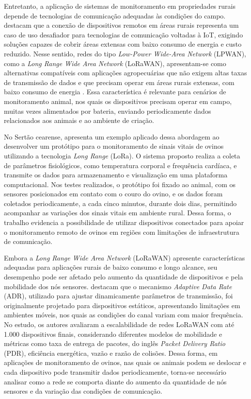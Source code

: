 Entretanto, a aplicação de sistemas de monitoramento em propriedades rurais depende de tecnologias de comunicação adequadas às condições do campo.  destacam que a conexão de dispositivos remotos em áreas rurais representa um caso de uso desafiador para tecnologias de comunicação voltadas à IoT, exigindo soluções capazes de cobrir áreas extensas com baixo consumo de energia e custo reduzido. Nesse sentido, redes do tipo \textit{Low-Power Wide-Area Network} (LPWAN), como a \textit{Long Range Wide Area Network} (LoRaWAN), apresentam-se como alternativas compatíveis com aplicações agropecuárias que não exigem altas taxas de transmissão de dados e que precisam operar em áreas rurais extensas, com baixo consumo de energia \cite{pagano2023}. Essa característica é relevante para cenários de monitoramento animal, nos quais os dispositivos precisam operar em campo, muitas vezes alimentados por bateria, enviando periodicamente dados relacionados aos animais e ao ambiente de criação.

No Sertão cearense,  apresenta um exemplo aplicado dessa abordagem ao desenvolver um protótipo para o monitoramento de sinais vitais de ovinos utilizando a tecnologia \textit{Long Range} (LoRa). O sistema proposto realiza a coleta de parâmetros fisiológicos, como temperatura corporal e frequência cardíaca, e transmite os dados para armazenamento e visualização em uma plataforma computacional. Nos testes realizados, o protótipo foi fixado ao animal, com os sensores posicionados em contato com o couro do ovino, e os dados foram coletados periodicamente, a cada cinco minutos, durante dois dias, permitindo acompanhar as variações dos sinais vitais em ambiente rural. Dessa forma, o trabalho evidencia a possibilidade de utilizar dispositivos conectados para apoiar o monitoramento remoto de ovinos em regiões com limitações de infraestrutura de comunicação.


Embora a \textit{Long Range Wide Area Network} (LoRaWAN) apresente características adequadas para aplicações rurais de baixo consumo e longo alcance, seu desempenho pode ser afetado pelo aumento da quantidade de dispositivos e pela mobilidade dos nós sensores.  destacam que o mecanismo \textit{Adaptive Data Rate} (ADR), utilizado para ajustar dinamicamente parâmetros de transmissão, foi originalmente projetado para dispositivos estáticos, apresentando limitações em ambientes móveis, nos quais as condições do canal variam com maior frequência. No estudo, os autores avaliaram a escalabilidade de redes LoRaWAN com até 1.000 dispositivos finais, considerando diferentes modelos de mobilidade e métricas como taxa de entrega de pacotes, do inglês \textit{Packet Delivery Ratio} (PDR), eficiência energética, vazão e razão de colisões. Dessa forma, em aplicações de monitoramento de ovinos, nas quais os animais podem se deslocar e cada dispositivo pode transmitir dados periodicamente, torna-se necessário analisar como a rede se comporta diante do aumento da quantidade de nós sensores e da variação das condições de comunicação.


